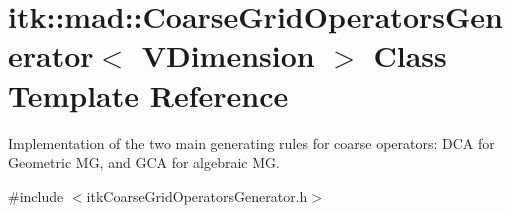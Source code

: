 \hypertarget{classitk_1_1mad_1_1_coarse_grid_operators_generator}{\section{itk\-:\-:mad\-:\-:Coarse\-Grid\-Operators\-Generator$<$ V\-Dimension $>$ Class Template Reference}
\label{classitk_1_1mad_1_1_coarse_grid_operators_generator}
}


Implementation of the two main generating rules for coarse operators\-: D\-C\-A for Geometric M\-G, and G\-C\-A for algebraic M\-G.  




{\ttfamily \#include $<$itk\-Coarse\-Grid\-Operators\-Generator.\-h$>$}

